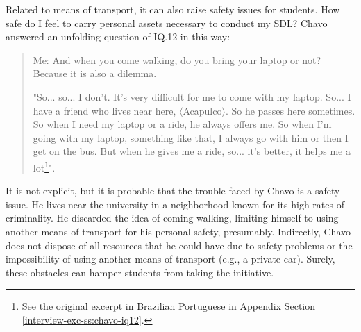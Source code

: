 Related to means of transport, it can also raise safety issues for students. How safe do I feel to carry personal assets necessary to conduct my \gls{SDL}? Chavo answered an unfolding question of \gls{IQ}.12 in this way:
\begin{quote}
    \colorbox{black!15}{Me: And when you come walking, do you bring your laptop or not? Because it is} \colorbox{black!15}{also a dilemma.}

    "So... so... I don't. It's very difficult for me to come with my laptop. So... I have a friend who lives near here, $\langle$Acapulco$\rangle$. So he passes here sometimes. So when I need my laptop or a ride, he always offers me. So when I'm going with my laptop, something like that, I always go with him or then I get on the bus. But when he gives me a ride, so... it's better, it helps me a lot\footnote{See the original excerpt in Brazilian Portuguese in Appendix Section \ref{interview-exc-ss:chavo-iq12}.}".
\end{quote}
It is not explicit, but it is probable that the trouble faced by Chavo is a safety issue. He lives near the university in a neighborhood known for its high rates of criminality. He discarded the idea of coming walking, limiting himself to using another means of transport for his personal safety, presumably. Indirectly, Chavo does not dispose of all resources that he could have due to safety problems or the impossibility of using another means of transport (e.g., a private car). Surely, these obstacles can hamper students from taking the initiative.

